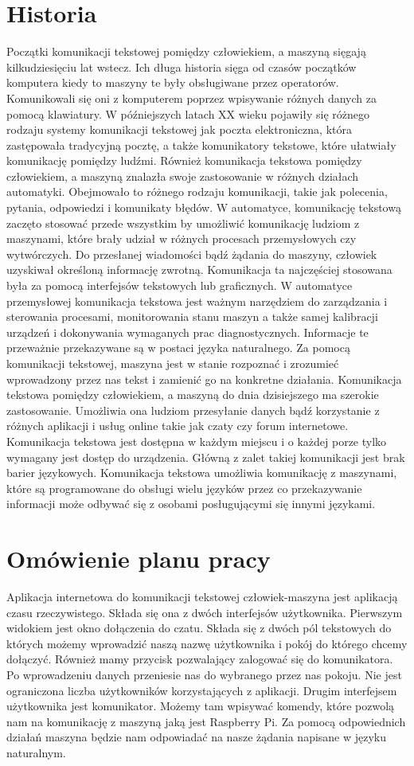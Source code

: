 \section{Historia}
Początki komunikacji tekstowej pomiędzy człowiekiem, a maszyną sięgają kilkudziesięciu lat wstecz. Ich długa historia sięga od czasów początków komputera kiedy to maszyny te były obsługiwane przez operatorów. Komunikowali się oni z komputerem poprzez wpisywanie różnych danych za pomocą klawiatury. W późniejszych latach XX wieku pojawiły się różnego rodzaju systemy komunikacji tekstowej jak poczta elektroniczna, która zastępowała tradycyjną pocztę, a także komunikatory tekstowe, które ułatwiały komunikację pomiędzy ludźmi. Również komunikacja tekstowa pomiędzy człowiekiem, a maszyną znalazła swoje zastosowanie w różnych działach automatyki. Obejmowało to różnego rodzaju komunikacji, takie jak polecenia, pytania, odpowiedzi i komunikaty błędów. W automatyce, komunikację tekstową zaczęto stosować przede wszystkim by umożliwić komunikację ludziom z maszynami, które brały udział w różnych procesach przemysłowych czy wytwórczych. Do przesłanej wiadomości bądź żądania do maszyny, człowiek uzyskiwał określoną informację zwrotną. Komunikacja ta najczęściej stosowana była za pomocą interfejsów tekstowych lub graficznych. W automatyce przemysłowej komunikacja tekstowa jest ważnym narzędziem do zarządzania i sterowania procesami, monitorowania stanu maszyn a także samej kalibracji urządzeń i dokonywania wymaganych prac diagnostycznych. Informacje te przeważnie przekazywane są w postaci języka naturalnego. Za pomocą komunikacji tekstowej, maszyna jest w stanie rozpoznać i zrozumieć wprowadzony przez nas tekst i zamienić go na konkretne działania. Komunikacja tekstowa pomiędzy człowiekiem, a maszyną do dnia dzisiejszego ma szerokie zastosowanie. Umożliwia ona ludziom przesyłanie danych bądź korzystanie z różnych aplikacji i usług online takie jak czaty czy forum internetowe. Komunikacja tekstowa jest dostępna w każdym miejscu i o każdej porze tylko wymagany jest dostęp do urządzenia. Główną z zalet takiej komunikacji jest brak barier językowych. Komunikacja tekstowa umożliwia komunikację z maszynami, które są programowane do obsługi wielu języków przez co przekazywanie informacji może odbywać się z osobami posługującymi się innymi językami.
\newpage
\section{Omówienie planu pracy}
Aplikacja internetowa do komunikacji tekstowej człowiek-maszyna jest aplikacją czasu rzeczywistego. Składa się ona z dwóch interfejsów użytkownika. Pierwszym widokiem jest okno dołączenia do czatu. Składa się z dwóch pól tekstowych do których możemy wprowadzić naszą nazwę użytkownika i pokój do którego chcemy dołączyć. Również mamy przycisk pozwalający zalogować się do komunikatora. Po wprowadzeniu danych przeniesie nas do wybranego przez nas pokoju. Nie jest ograniczona liczba użytkowników korzystających z aplikacji. 
Drugim interfejsem użytkownika jest komunikator. Możemy tam wpisywać komendy, które pozwolą nam na komunikację z maszyną jaką jest Raspberry Pi. Za pomocą odpowiednich działań maszyna będzie nam odpowiadać na nasze żądania napisane w języku naturalnym. 

